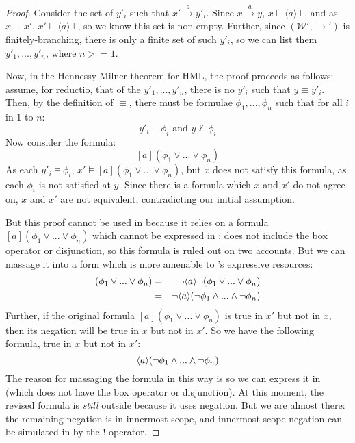 \begin{proof}
Consider the set of $y'_i$ such that $x' \xrightarrow{a} y'_i$. Since $x \xrightarrow{a} y$, $x \models \langle a \rangle \top$, and as $x \equiv x'$,  $x' \models \langle a \rangle \top$, so we know this set is non-empty.
Further, since $(\mathcal{W}', \rightarrow')$ is finitely-branching, there is only a finite set of such $y'_i$, so we can list them $y'_1, ..., y'_n$,  where $n >= 1$.

Now, in the Hennessy-Milner theorem for HML, the proof proceeds as follows:
assume, for reductio, that of the $y'_1, ..., y'_n$, there is no $y'_i$ such that $y \equiv y'_i$.
Then, by the definition of $\equiv$, there must be formulae $\phi_1, ..., \phi_n$ such that for all $i$ in $1$ to $n$:
\[
y'_i \models \phi_i \mbox{ and } y \nvDash \phi_i
\]
Now consider the formula:
\[
[a] (\phi_1 \lor ... \lor \phi_n)
\]
As each $y'_i \models \phi_i$, $x' \models [a] (\phi_1 \lor ... \lor \phi_n)$, but $x$ does not satisfy this formula, as each $\phi_i$ is not satisfied at $y$.
Since there is a formula which $x$ and $x'$ do not agree on, $x$ and $x'$ are not equivalent, contradicting our initial assumption.

But this proof cannot be used in \ELABR{} because it relies on a formula $[a] (\phi_1 \lor ... \lor \phi_n)$ which cannot be expressed in \ELABR{}: 
\ELABR{} does not include the box operator or disjunction, so this formula is ruled out on two accounts.
But we can massage it into a form which is more amenable to \ELABR{}'s expressive resources:
\begin{eqnarray*}
[a] (\phi_1 \lor ... \lor \phi_n) & = & \neg \langle a \rangle \neg (\phi_1 \lor ... \lor \phi_n)  \\
	& = & \neg \langle a \rangle (\neg \phi_1\AND ... \AND \neg \phi_n) 
\end{eqnarray*}
Further, if the original formula $[a] (\phi_1 \lor ... \lor \phi_n)$ is true in $x'$ but not in $x$, then its negation will be true in $x$ but not in $x'$. 
So we have the following formula, true in $x$ but not in $x'$:
\[
 \langle a \rangle (\neg \phi_1\land ... \land \neg \phi_n)
 \]
The reason for massaging the formula in this way is so we can express it in \ELABR{} (which does not have the box operator or disjunction).
At this moment, the revised formula is \emph{still} outside \ELABR{} because it uses negation. 
But we are almost there: the remaining negation is in innermost scope, and innermost scope negation can be simulated in \ELABR{} by the $!$ operator. 


\end{proof}
